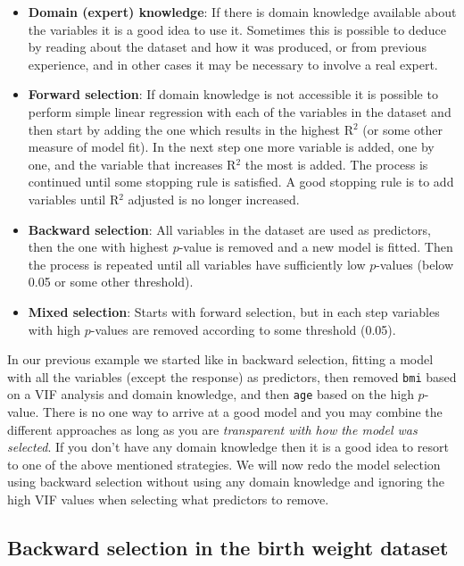 \documentclass[
  letterpaper,
  DIV=11,
  numbers=noendperiod]{scrreprt}
\providecommand{\tightlist}{%
  \setlength{\itemsep}{0pt}\setlength{\parskip}{0pt}}\usepackage{longtable,booktabs,array}
\begin{document}
\begin{itemize}
\tightlist
\item
  \textbf{Domain (expert) knowledge}: If there is domain knowledge
  available about the variables it is a good idea to use it. Sometimes
  this is possible to deduce by reading about the dataset and how it was
  produced, or from previous experience, and in other cases it may be
  necessary to involve a real expert.
\item
  \textbf{Forward selection}: If domain knowledge is not accessible it
  is possible to perform simple linear regression with each of the
  variables in the dataset and then start by adding the one which
  results in the highest R\(^2\) (or some other measure of model fit).
  In the next step one more variable is added, one by one, and the
  variable that increases R\(^2\) the most is added. The process is
  continued until some stopping rule is satisfied. A good stopping rule
  is to add variables until R\(^2\) adjusted is no longer increased.
\item
  \textbf{Backward selection}: All variables in the dataset are used as
  predictors, then the one with highest \(p\)-value is removed and a new
  model is fitted. Then the process is repeated until all variables have
  sufficiently low \(p\)-values (below 0.05 or some other threshold).
\item
  \textbf{Mixed selection}: Starts with forward selection, but in each
  step variables with high \(p\)-values are removed according to some
  threshold (0.05).
\end{itemize}

In our previous example we started like in backward selection, fitting a
model with all the variables (except the response) as predictors, then
removed \texttt{bmi} based on a VIF analysis and domain knowledge, and
then \texttt{age} based on the high \(p\)-value. There is no one way to
arrive at a good model and you may combine the different approaches as
long as you are \emph{transparent with how the model was selected}. If
you don't have any domain knowledge then it is a good idea to resort to
one of the above mentioned strategies. We will now redo the model
selection using backward selection without using any domain knowledge
and ignoring the high VIF values when selecting what predictors to
remove.

\subsection{Backward selection in the birth weight
dataset}\label{backward-selection-in-the-birth-weight-dataset}
\end{document}
